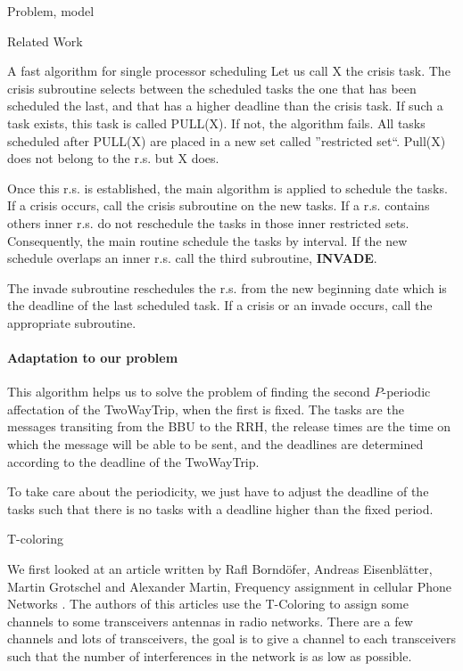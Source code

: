 \documentclass[a4paper,10pt]{report}
\begin{document}
\begin{chapter}{Problem, model}
\begin{section}{Related Work}
\begin{subsection}{A fast algorithm for single processor scheduling}
Let us call X the crisis task.
The crisis subroutine selects between the scheduled tasks the one that has been scheduled the last, and that has a higher deadline than the crisis task.
If such a task exists, this task is called PULL(X). If not, the algorithm fails.
All tasks scheduled after PULL(X) are placed in a new set called ''restricted set``.
Pull(X) does not belong to the r.s. but X does.

Once this r.s. is established, the main algorithm is applied to schedule the tasks. If a crisis occurs, call the crisis subroutine on the new tasks.
If a r.s. contains others inner r.s. do not reschedule the tasks in those inner restricted sets. Consequently, the main routine schedule 
the tasks by interval. If the new schedule overlaps an inner r.s. call the third subroutine, {\bf INVADE}.

The invade subroutine reschedules the r.s. from the new beginning date which is the deadline of the last scheduled task. If a crisis or an invade occurs,
call the appropriate subroutine.

\paragraph{Adaptation to our problem}
This algorithm helps us to solve the problem of finding the second $P$-periodic affectation of the TwoWayTrip, when the first is fixed. 
The tasks are the messages transiting from the BBU to the RRH, the release times are the time on which the message will be able to be sent,
and the deadlines are determined according to the deadline of the TwoWayTrip.

To take care about the periodicity, we just have to adjust the deadline of the tasks such that there is no tasks with a deadline 
higher than the fixed period.

\end{subsection}


\begin{subsection}{T-coloring}


 We first looked at an article written by Rafl Borndöfer, Andreas Eisenblätter, Martin Grotschel and Alexander Martin, Frequency assignment
 in cellular Phone Networks \cite{borndorfer1998frequency}. The authors of this articles use the T-Coloring to assign some channels to some 
 transceivers antennas in radio networks. There are a few channels and lots of transceivers, the goal is to give a channel to each transceivers
 such that the number of interferences in the network is as low as possible.
 

\end{subsection}
\end{section}
\end{chapter}
\end{document}
